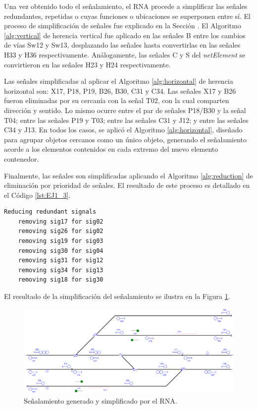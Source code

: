 	Una vez obtenido todo el señalamiento, el RNA procede a simplificar las señales redundantes, repetidas o cuyas funciones o ubicaciones se superponen entre sí. El proceso de simplificación de señales fue explicado en la Sección \label{sec:simplificacion}. El Algoritmo \ref{alg:vertical} de herencia vertical fue aplicado en las señales B entre los cambios de vías Sw12 y Sw13, desplazando las señales hasta convertirlas en las señales H33 y H36 respectivamente. Análogamente, las señales C y S del \textit{netElement} se convirtieron en las señales H23 y H24 respectivamente.
	
	Las señales simplificadas al aplicar el Algoritmo \ref{alg:horizontal} de herencia horizontal son: X17, P18, P19, B26, B30, C31 y C34. Las señales X17 y B26 fueron eliminadas por su cercanía con la señal T02, con la cual comparten dirección y sentido. Lo mismo ocurre entre el par de señales P18/B30 y la señal T04; entre las señales P19 y T03; entre las señales C31 y J12; y entre las señales C34 y J13. En todos los casos, se aplicó el Algoritmo \ref{alg:horizontal}, diseñado para agrupar objetos cercanos como un único objeto, generando el señalamiento acorde a los elementos contenidos en cada extremo del nuevo elemento contenedor.
	
	Finalmente, las señales son simplificadas aplicando el Algoritmo \ref{alg:reduction} de eliminación por prioridad de señales. El resultado de este proceso es detallado en el Código \ref{lst:EJ1_3}.
	
	\begin{lstlisting}[language = {}, caption = Reducción de señalamiento por prioridad de señales, label = {lst:EJ1_3}]
	Reducing redundant signals
	removing sig17 for sig02
	removing sig26 for sig02
	removing sig19 for sig03
	removing sig30 for sig04
	removing sig31 for sig12
	removing sig34 for sig13
	removing sig18 for sig30
	\end{lstlisting}
	
	El resultado de la simplificación del señalamiento se ilustra en la Figura \ref{fig:EJ1_7}.
	
	\begin{figure}[H]
		\centering
		\includegraphics[width=1\textwidth]{resultados-obtenidos/ejemplo1/images/1_RNA.png}
		\centering\caption{Señalamiento generado y simplificado por el RNA.}
		\label{fig:EJ1_7}
	\end{figure}
	
